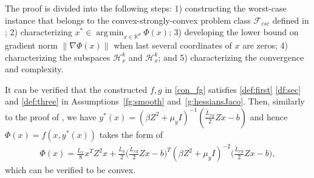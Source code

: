 \documentclass{osudissert96}
\DeclareMathOperator*{\argmin}{arg\,min}
\begin{document}
 The proof is divided into the following steps: 
1) constructing the worst-case instance that belongs to the convex-strongly-convex problem class $\mathcal{F}_{csc}$ defined in ; 2) characterizing $x^*\in \argmin_{x\in\mathbb{R}^d}\Phi(x)$; 3) developing the lower bound on gradient norm $\|\nabla\Phi(x)\|$ when last several coordinates of $x$ are zeros; 4) characterizing the subspaces $\mathcal{H}_x^k$ and $\mathcal{H}_x^k$; and 5) characterizing the convergence and complexity.


\vspace{0.2cm}
\vspace{0.2cm}

It can be verified that  the constructed $f,g$ in \cref{con_fg} satisfies \cref{def:first} \eqref{df:sec} and \eqref{def:three}  in Assumptions~\ref{fg:smooth} and~\ref{g:hessiansJaco}.  Then, similarly to the proof of , we have $y^*(x) = (\beta Z^2 +\mu_y I)^{-1} (\frac{\widetilde L_{xy}}{2} Zx-b)$ and hence $\Phi(x) = f(x,y^*(x))$ takes the form of 
\begin{align*}
\Phi(x) =  \frac{L_x}{8} x^T Z^2 x+ \frac{L_y}{2} \Big (\frac{\widetilde L_{xy}}{2} Zx-b \Big)^T (\beta Z^2 +\mu_y I)^{-2}\Big(\frac{\widetilde L_{xy}}{2} Zx-b\Big),
\end{align*}
which can be verified to be convex. 
\end{document}
